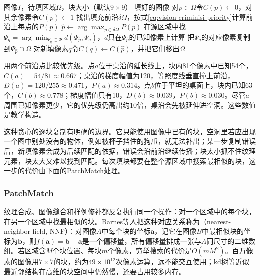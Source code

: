 \begin{algorithm}[Criminisi样例修补]
 \label{alg:vision-criminisi}
 \begin{algorithmic}[1]
  \Require 图像$I$，待填区域$\Omega$，块大小（默认$9\times9$）
  \Ensure 填好的图像
  \State 对$p\in\Omega$令$C(p)\gets0$，对其余像素令$C(p)\gets1$
  \While{$\Omega\neq\varnothing$}
   \State 找出填充前沿$\delta\Omega$，按式\eqref{eq:vision-criminisi-priority}计算前沿上每点的$P(p)$
   \State $\hat p\gets\arg\max_{p\in\delta\Omega}P(p)$
   \State 在源区域中找$\Psi_{\hat q}=\arg\min_{\Psi_q\subset\Phi}d(\Psi_{\hat p},\Psi_q)$，$d$只在$\Psi_{\hat p}$的已知像素上计算
   \State 把$\Psi_{\hat q}$的对应像素复制到$\Psi_{\hat p}\cap\Omega$
   \State 对新填像素$q$令$C(q)\gets C(\hat p)$，并把它们移出$\Omega$
  \EndWhile
 \end{algorithmic}
\end{algorithm}

用两个前沿点比较优先级。点$a$位于桌沿的延长线上，块内81个像素中已知54个，$C(a)=54/81\approx0.667$；桌沿的梯度幅值为120，等照度线垂直撞上前沿，$D(a)=120/255\approx0.471$，$P(a)\approx0.314$。点$b$位于平坦的桌面上，块内已知63个，$C(b)\approx0.778$；梯度幅值只有10，$D(b)\approx0.039$，$P(b)\approx0.030$。尽管$a$周围已知像素更少，它的优先级仍高出约10倍，桌沿会先被延伸进空洞。这些数值是教学构造。

这种贪心的逐块复制有明确的边界。它只能使用图像中已有的块，空洞里若应出现一个图中别处没有的物体，例如被杯子挡住的狗爪，就无法补出；某一步复制错误后，新填像素会成为后续匹配的依据，错误会沿前沿继续传播；块太小抓不住纹理元素，块太大又难以找到匹配。每次填块都要在整个源区域中搜索最相似的块，这一步的代价由下面的PatchMatch处理。

\subsubsection{PatchMatch}
\label{sec:vision-generation-patchmatch}

纹理合成、图像缝合和样例修补都反复执行同一个操作：对一个区域中的每个块，在另一个区域中找最相似的块。Barnes等人把这种对应关系称为（nearest-neighbor field, NNF）：对图像$A$中每个块的坐标$\bm{a}$，记它在图像$B$中最相似块的坐标为$\bm{b}$，则$f(\bm{a})=\bm{b}-\bm{a}$是一个偏移量，所有偏移量排成一张与$A$同尺寸的二维数组。若区域含$M$个块位置、每块$m$个像素，穷举搜索的代价是$O(mM^2)$。百万像素的图像用$7\times7$的块，约为$49\times10^{12}$次像素运算，远不能交互使用；kd树等近似最近邻结构在高维的块空间中仍然慢，还要占用较多内存。

